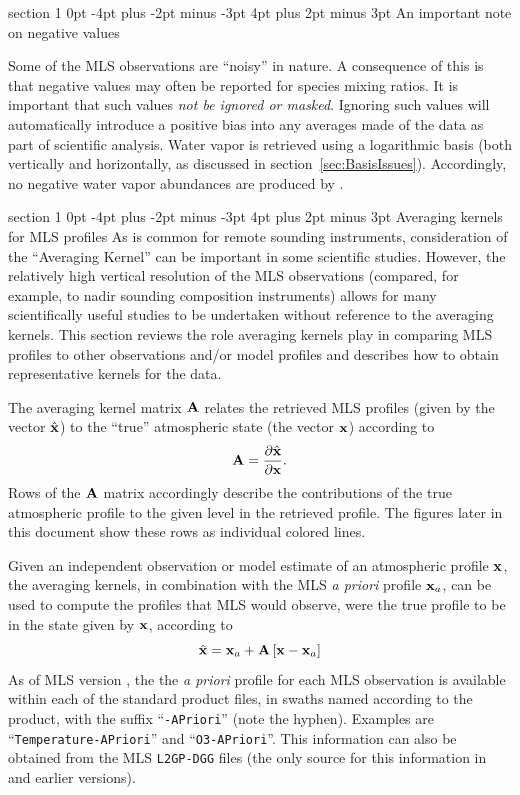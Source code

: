 \documentclass[11pt,draft]{report}
\makeatletter
\renewcommand{\section}{\@startsection%
  {section}%
  {1}%
  {0pt}%
  {-4pt plus -2pt minus -3pt}%
  {4pt plus 2pt minus 3pt}%
  {\Large\sffamily\fontseries{sb}\selectfont\flushleft\color{SectionColor}\figureversion{tabular}}}%
\makeatother
\begin{document}
\section{An important note on negative values}
\label{sec:NegativeValuesOK}

Some of the MLS observations are ``noisy'' in nature.  A consequence of
this is that negative values may often be reported for species mixing
ratios.  It is important that such values \emph{not be ignored or
  masked}.  Ignoring such values will automatically introduce a positive
bias into any averages made of the data as part of scientific analysis.
Water vapor is retrieved using a logarithmic basis (both vertically and
horizontally, as discussed in section~\ref{sec:BasisIssues}).
Accordingly, no negative water vapor abundances are produced by \thisv.

\section{Averaging kernels for MLS \thisv profiles}
\label{sec:AveragingKernels}
As is common for remote sounding instruments, consideration of the
``Averaging Kernel'' \citep[e.g.,][]{Rodgers00} can be important in some
scientific studies.  However, the relatively high vertical resolution of
the MLS observations (compared, for example, to nadir sounding
composition instruments) allows for many scientifically useful studies
to be undertaken without reference to the averaging kernels.  This
section reviews the role averaging kernels play in comparing MLS
profiles to other observations and/or model profiles and describes how
to obtain representative kernels for the \thisv data.

The averaging kernel matrix $\mathbf{A}$ relates the retrieved MLS profiles
(given by the vector $\hat{\mathbf{x}}$) to the ``true'' atmospheric state (the
vector $\mathbf{x}$) according to
\begin{equation}
  \mathbf{A} = \frac{\partial\hat{\mathbf{x}}}{\partial\mathbf{x}}.
\end{equation}
Rows of the $\mathbf{A}$ matrix accordingly describe the contributions of the
true atmospheric profile to the given level in the retrieved profile.
The figures later in this document show these rows as individual colored
lines.

Given an independent observation or model estimate of an atmospheric
profile $\mathbf{x}$, the averaging kernels, in combination with the MLS
\emph{a priori} profile $\mathbf{x}_a$, can be used to compute the profiles
that MLS would observe, were the true profile to be in the state given
by $\mathbf{x}$, according to
\begin{equation}
  \hat{\mathbf{x}} = \mathbf{x}_a + \mathbf{A}\left[\mathbf{x}-\mathbf{x}_a\right]
\label{eqn:AVKApplication}
\end{equation}
As of MLS version \thisv, the the \emph{a priori} profile for each MLS
observation is available within each of the standard product files, in
swaths named according to the product, with the suffix
``\texttt{-APriori}'' (note the hyphen).  Examples are
``\texttt{Temperature-APriori}'' and ``\texttt{O3-APriori}''.  This
information can also be obtained from the MLS \texttt{L2GP-DGG} files
(the only source for this information in \prevv and earlier versions).
\end{document}
